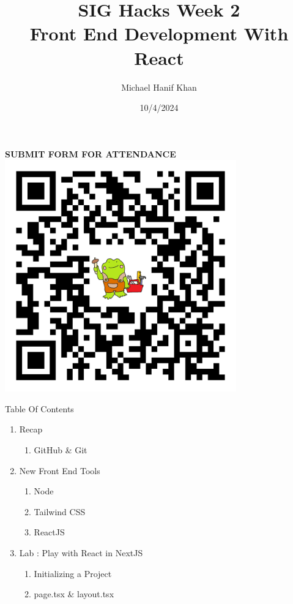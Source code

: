 \documentclass{beamer}
\title{SIG Hacks Week 2 \\
Front End Development With React}
\date{10/4/2024}
\author{Michael Hanif Khan}
\institute{The Association for Computing Machinery @ UIC}
\begin{document}
 	\maketitle

	\begin{frame}
		\begin{center}
		\textbf{SUBMIT FORM FOR ATTENDANCE} \\
		\includegraphics[width=0.75\textwidth]{qr.png}
		\end{center}
	\end{frame}
	\begin{frame}{Table Of Contents}
		\begin{enumerate}
			\item Recap
			\begin{enumerate}
				\item GitHub \& Git
			\end{enumerate}
			\item New Front End Tools
			\begin{enumerate}
				\item Node
				\item Tailwind CSS
				\item ReactJS
			\end{enumerate}
			\item Lab : Play with React in NextJS
			\begin{enumerate}
				\item Initializing a Project
				\item page.tsx \& layout.tsx
			\end{enumerate}
		\end{enumerate}
	\end{frame}
\end{document}
